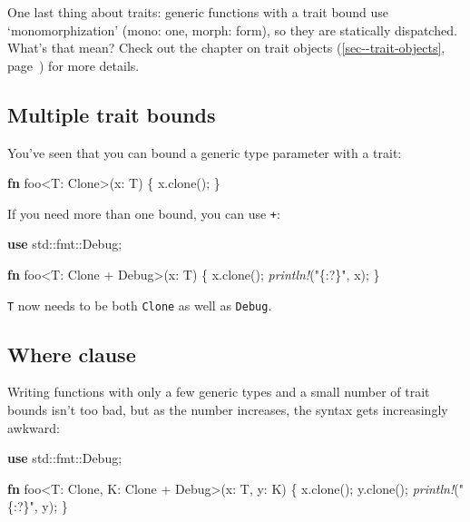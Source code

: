 \documentclass[a4paper,]{book}
\renewcommand*{\hyperref}[2][\ar]{%
  \def\ar{#2}%
  #2 (\autoref{#1}, page~\pageref{#1})}
\newenvironment{Shaded}{\begin{snugshade}}{\end{snugshade}}
\newcommand{\KeywordTok}[1]{\textcolor[rgb]{0.13,0.29,0.53}{\textbf{{#1}}}}
\newcommand{\StringTok}[1]{\textcolor[rgb]{0.31,0.60,0.02}{{#1}}}
\newcommand{\BuiltInTok}[1]{{#1}}
\newcommand{\PreprocessorTok}[1]{\textcolor[rgb]{0.56,0.35,0.01}{\textit{{#1}}}}
\newcommand{\NormalTok}[1]{{#1}}
\begin{document}
One last thing about traits: generic functions with a trait bound use
`monomorphization' (mono: one, morph: form), so they are statically
dispatched. What's that mean? Check out the chapter on
\hyperref[sec--trait-objects]{trait objects} for more details.

\subsection{Multiple trait bounds}\label{multiple-trait-bounds}

You've seen that you can bound a generic type parameter with a trait:

\begin{Shaded}
\begin{Highlighting}[]
\KeywordTok{fn} \NormalTok{foo<T: }\BuiltInTok{Clone}\NormalTok{>(x: T) \{}
    \NormalTok{x.clone();}
\NormalTok{\}}
\end{Highlighting}
\end{Shaded}

If you need more than one bound, you can use \texttt{+}:

\begin{Shaded}
\begin{Highlighting}[]
\KeywordTok{use} \NormalTok{std::fmt::}\BuiltInTok{Debug}\NormalTok{;}

\KeywordTok{fn} \NormalTok{foo<T: }\BuiltInTok{Clone} \NormalTok{+ }\BuiltInTok{Debug}\NormalTok{>(x: T) \{}
    \NormalTok{x.clone();}
    \PreprocessorTok{println!}\NormalTok{(}\StringTok{"\{:?\}"}\NormalTok{, x);}
\NormalTok{\}}
\end{Highlighting}
\end{Shaded}

\texttt{T} now needs to be both \texttt{Clone} as well as
\texttt{Debug}.

\subsection{Where clause}\label{where-clause}

Writing functions with only a few generic types and a small number of
trait bounds isn't too bad, but as the number increases, the syntax gets
increasingly awkward:

\begin{Shaded}
\begin{Highlighting}[]
\KeywordTok{use} \NormalTok{std::fmt::}\BuiltInTok{Debug}\NormalTok{;}

\KeywordTok{fn} \NormalTok{foo<T: }\BuiltInTok{Clone}\NormalTok{, K: }\BuiltInTok{Clone} \NormalTok{+ }\BuiltInTok{Debug}\NormalTok{>(x: T, y: K) \{}
    \NormalTok{x.clone();}
    \NormalTok{y.clone();}
    \PreprocessorTok{println!}\NormalTok{(}\StringTok{"\{:?\}"}\NormalTok{, y);}
\NormalTok{\}}
\end{Highlighting}
\end{Shaded}
\end{document}
